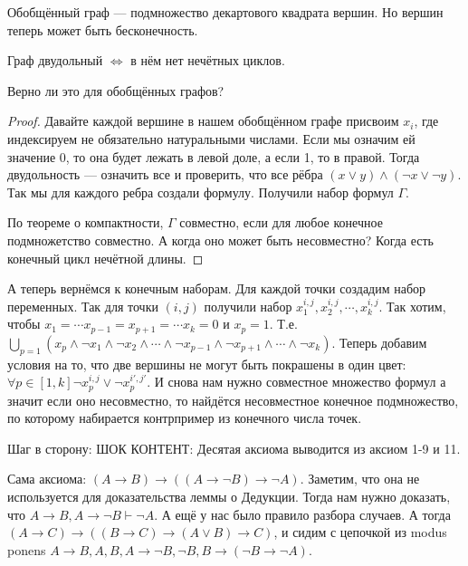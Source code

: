 \begin{definition}
	Обобщённый граф --- подмножество декартового квадрата вершин. Но вершин теперь может быть бесконечность.
\end{definition}
\begin{definition}
	Граф двудольный $\Leftrightarrow$ в нём нет нечётных циклов. 
\end{definition}

\begin{theorem}
Верно ли это для обобщённых графов? 
\end{theorem}
\begin{proof}
Давайте каждой вершине в нашем обобщённом графе присвоим $x_i$, где индексируем не обязательно натуральными числами. Если мы означим ей значение 0, то она будет лежать в левой доле, а если 1, то в правой. Тогда двудольность --- означить все и проверить, что все рёбра $(x \lor y) \land (\lnot x \lor \lnot y)$. Так мы для каждого ребра создали формулу. Получили набор формул $\Gamma$.

По теореме о компактности, $\Gamma$ совместно, если для любое конечное подмножетство совместно. А когда оно может быть несовместно? Когда есть конечный цикл нечётной длины.
\end{proof}

А теперь вернёмся к конечным наборам. Для каждой точки создадим набор переменных. Так для точки $(i, j)$ получили набор $x_1^{i, j}, x_2^{i, j}, \cdots, x_k^{i, j}$. Так хотим, чтобы $x_1 = \cdots x_{p-1} = x_{p+1} = \cdots x_k = 0$ и $x_p = 1$. Т.е. $\bigcup_{p=1} (x_p \land \lnot x_1 \land \lnot x_2 \land \cdots \land \lnot x_{p-1} \land \lnot x_{p+1} \land \cdots \land \lnot x_k)$. Теперь добавим условия на то, что две вершины не могут быть покрашены в один цвет: $\forall p \in [1, k] \lnot x_p^{i, j} \lor \lnot x_p^{i', j'}$. И снова нам нужно совместное множество формул а значит если оно несовместно, то найдётся несовместное конечное подмножество, по которому набирается контрпример из конечного числа точек.

Шаг в сторону: ШОК КОНТЕНТ: Десятая аксиома выводится из аксиом 1-9 и 11.

Сама аксиома: $(A \to B) \to ((A \to \lnot B) \to \lnot A)$. Заметим, что она не используется для доказательства леммы о Дедукции. Тогда нам нужно доказать, что $A \to B, A \to \lnot B \vdash \lnot A$. А ещё у нас было правило разбора случаев. А тогда $(A \to C) \to ((B \to C) \to (A \lor B) \to C)$, и сидим с цепочкой из modus ponens $A \to B, A, B, A \to \lnot B, \lnot B, B \to (\lnot B \to \lnot A)$. 

